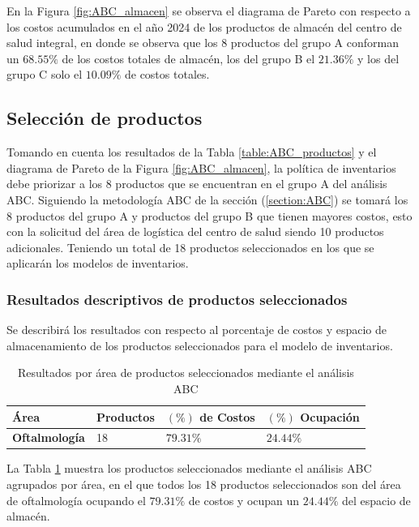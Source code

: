 En la Figura \ref{fig:ABC_almacen} se observa el diagrama de Pareto con respecto a los costos acumulados en el año 2024 de los productos de almacén del centro de salud integral, en donde se observa que los 8 productos del grupo A conforman un $68.55\%$ de los costos totales de almacén, los del grupo B el $21.36\%$ y los del grupo C solo el $10.09\%$ de costos totales.

\subsection{Selección de productos}

Tomando en cuenta los resultados de la Tabla \ref{table:ABC_productos} y el diagrama de Pareto de la Figura \ref{fig:ABC_almacen}, la política de inventarios debe priorizar a los 8 productos que se encuentran en el grupo A del análisis ABC. Siguiendo la metodología ABC de la sección (\ref{section:ABC}) se tomará los 8 productos del grupo A y productos del grupo B que tienen mayores costos, esto con la solicitud del área de logística del centro de salud siendo 10 productos adicionales. Teniendo un total de 18 productos seleccionados en los que se aplicarán los modelos de inventarios.

\subsubsection{Resultados descriptivos de productos seleccionados}

Se describirá los resultados con respecto al porcentaje de costos y espacio de almacenamiento de los productos seleccionados para el modelo de inventarios.

\begin{table}[H]
    \caption{Resultados por área de productos seleccionados mediante el análisis ABC}
    \begin{tabular}{p{2cm} p{2.51cm} p{4cm} p{4cm}} %
        \hline
        \textbf{Área} & \textbf{Productos} & \textbf{$(\%)$ de Costos} & \textbf{$(\%)$ Ocupación} \\
        \hline
        \textbf{Oftalmología} & 18 & $79.31\%$ & $24.44\%$ \\
        \hline
    \end{tabular}
    \label{table:GrupoA_Area_Productos}
\end{table}

La Tabla \ref{table:GrupoA_Area_Productos} muestra los productos seleccionados mediante el análisis ABC agrupados por área, en el que todos los 18 productos seleccionados son del área de oftalmología ocupando el $79.31\%$ de costos y ocupan un $24.44\%$ del espacio de almacén.

